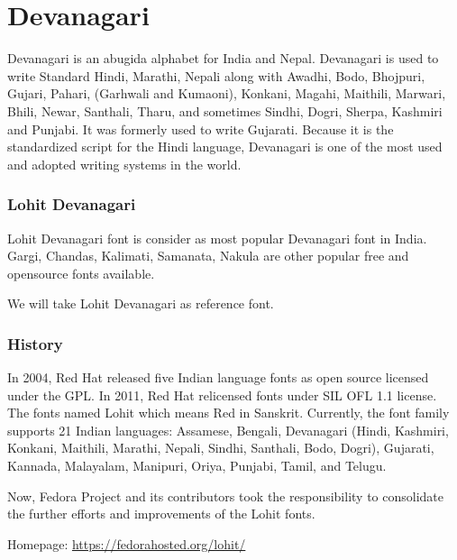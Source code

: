 \chapter{Devanagari}

Devanagari is an abugida alphabet for India and Nepal. Devanagari is used to
write Standard Hindi, Marathi, Nepali along with Awadhi, Bodo, Bhojpuri,
Gujari, Pahari, (Garhwali and Kumaoni), Konkani, Magahi, Maithili, Marwari,
Bhili, Newar, Santhali, Tharu, and sometimes Sindhi, Dogri, Sherpa, Kashmiri
and Punjabi. It was formerly used to write Gujarati. Because it is the
standardized script for the Hindi language, Devanagari is one of the most used
and adopted writing systems in the world.


\subsection{Lohit Devanagari}
Lohit Devanagari font is consider as most popular Devanagari font in India.
Gargi, Chandas, Kalimati, Samanata, Nakula are other popular free and
opensource fonts available.

We will take Lohit Devanagari as reference font.

\subsection{History}
In 2004, Red Hat released five Indian language fonts as open source licensed
under the GPL. In 2011, Red Hat relicensed fonts under SIL OFL 1.1 license.
The fonts named Lohit which means Red in Sanskrit. Currently, the font family
supports 21 Indian languages: Assamese, Bengali, Devanagari (Hindi, Kashmiri,
Konkani, Maithili, Marathi, Nepali, Sindhi, Santhali, Bodo, Dogri), Gujarati,
Kannada, Malayalam, Manipuri, Oriya, Punjabi, Tamil, and Telugu.

Now, Fedora Project and its contributors took the responsibility to consolidate
the further efforts and improvements of the Lohit fonts.

Homepage: {\url{https://fedorahosted.org/lohit/}}
